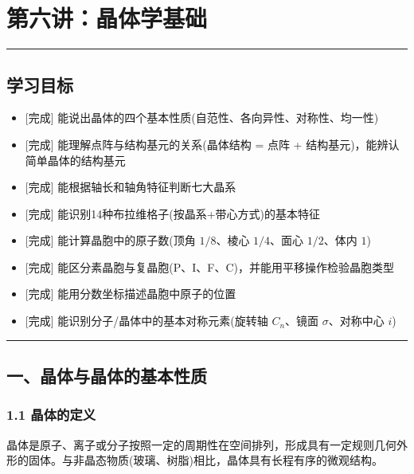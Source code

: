 \section{第六讲：晶体学基础}\label{ux7b2cux516dux8bb2ux6676ux4f53ux5b66ux57faux7840}

\begin{center}\rule{0.5\linewidth}{0.5pt}\end{center}

\subsection{学习目标}\label{ux5b66ux4e60ux76eeux6807}

\begin{itemize}
\tightlist
\item
  {[}完成{]} 能说出晶体的四个基本性质(自范性、各向异性、对称性、均一性)
\item
  {[}完成{]} 能理解点阵与结构基元的关系(晶体结构 = 点阵 + 结构基元)，能辨认简单晶体的结构基元
\item
  {[}完成{]} 能根据轴长和轴角特征判断七大晶系
\item
  {[}完成{]} 能识别14种布拉维格子(按晶系+带心方式)的基本特征
\item
  {[}完成{]} 能计算晶胞中的原子数(顶角 \(1/8\)、棱心 \(1/4\)、面心 \(1/2\)、体内 \(1\))
\item
  {[}完成{]} 能区分素晶胞与复晶胞(P、I、F、C)，并能用平移操作检验晶胞类型
\item
  {[}完成{]} 能用分数坐标描述晶胞中原子的位置
\item
  {[}完成{]} 能识别分子/晶体中的基本对称元素(旋转轴 \(C_n\)、镜面 \(\sigma\)、对称中心 \(i\))
\end{itemize}

\begin{center}\rule{0.5\linewidth}{0.5pt}\end{center}

\subsection{一、晶体与晶体的基本性质}\label{ux4e00ux6676ux4f53ux4e0eux6676ux4f53ux7684ux57faux672cux6027ux8d28}

\subsubsection{1.1 晶体的定义}\label{ux6676ux4f53ux7684ux5b9aux4e49}

晶体是原子、离子或分子按照一定的周期性在空间排列，形成具有一定规则几何外形的固体。与非晶态物质(玻璃、树脂)相比，晶体具有长程有序的微观结构。

